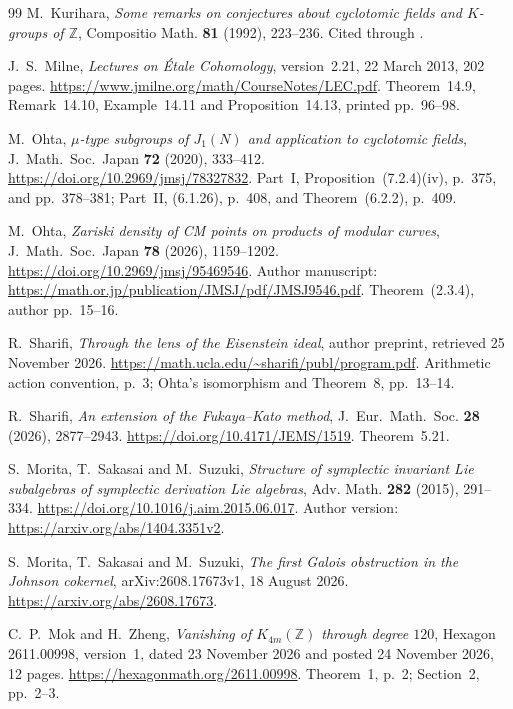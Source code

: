 \documentclass[11pt]{article}
\theoremstyle{definition}\newtheorem{definition}[theorem]{Definition}
\begin{document}
\begin{thebibliography}{99}
M.~Kurihara, \emph{Some remarks on conjectures about cyclotomic fields and
$K$-groups of $\mathbb Z$}, Compositio Math. \textbf{81} (1992), 223--236.
Cited through \cite[Chapter~VI, Theorem~10.9]{Weibel}.

J.~S.~Milne,
\emph{Lectures on \textup{\'Etale} Cohomology},
version~2.21, 22 March 2013, 202 pages.
\url{https://www.jmilne.org/math/CourseNotes/LEC.pdf}.
Theorem~14.9, Remark~14.10, Example~14.11 and Proposition~14.13,
printed pp.~96--98.

M.~Ohta, \emph{$\mu$-type subgroups of $J_1(N)$
and application to cyclotomic fields}, J.~Math.~Soc.~Japan
\textbf{72} (2020), 333--412.
\url{https://doi.org/10.2969/jmsj/78327832}.
Part~I, Proposition~(7.2.4)(iv), p.~375, and pp.~378--381;
Part~II, (6.1.26), p.~408, and Theorem~(6.2.2), p.~409.

M.~Ohta, \emph{Zariski density of CM points
on products of modular curves}, J.~Math.~Soc.~Japan
\textbf{78} (2026), 1159--1202.
\url{https://doi.org/10.2969/jmsj/95469546}.
Author manuscript: \url{https://math.or.jp/publication/JMSJ/pdf/JMSJ9546.pdf}.
Theorem~(2.3.4), author pp.~15--16.

R.~Sharifi, \emph{Through the lens of the
Eisenstein ideal}, author preprint, retrieved 25 November 2026.
\url{https://math.ucla.edu/~sharifi/publ/program.pdf}.
Arithmetic action convention, p.~3; Ohta's isomorphism and
Theorem~8, pp.~13--14.

R.~Sharifi, \emph{An extension of the
Fukaya--Kato method}, J.~Eur.~Math.~Soc. \textbf{28} (2026),
2877--2943. \url{https://doi.org/10.4171/JEMS/1519}.
Theorem~5.21.

S.~Morita, T.~Sakasai and M.~Suzuki,
\emph{Structure of symplectic invariant Lie subalgebras of
symplectic derivation Lie algebras}, Adv. Math. \textbf{282}
(2015), 291--334. \url{https://doi.org/10.1016/j.aim.2015.06.017}.
Author version: \url{https://arxiv.org/abs/1404.3351v2}.

S.~Morita, T.~Sakasai and M.~Suzuki,
\emph{The first Galois obstruction in the Johnson cokernel},
arXiv:2608.17673v1, 18 August 2026.
\url{https://arxiv.org/abs/2608.17673}.

C.~P.~Mok and H.~Zheng, \emph{Vanishing of $K_{4m}(\mathbb Z)$ through degree $120$},
Hexagon 2611.00998, version~1, dated 23 November 2026 and posted 24 November 2026, 12 pages.
\url{https://hexagonmath.org/2611.00998}.
Theorem~1, p.~2; Section~2, pp.~2--3.


\end{thebibliography}
\end{document}
